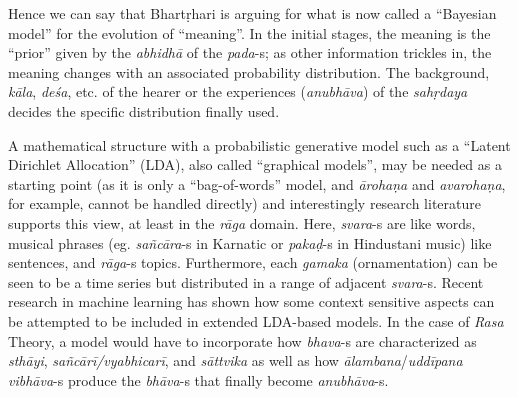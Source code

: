 Hence we can say that Bhartṛhari is arguing for what is now called a “Bayesian model” for the evolution of “meaning”. In the initial stages, the meaning is the “prior” given by the \textsl{abhidhā} of the \textsl{pada}-s; as other information trickles in, the meaning changes with an associated probability distribution. The background, \textsl{kāla}, \textsl{deśa}, etc. of the hearer or the experiences (\textsl{anubhāva}) of the \textsl{sahṛdaya} decides the specific distribution finally used. 

A mathematical structure with a probabilistic generative model such as a “Latent Dirichlet Allocation” (LDA), also called “graphical models”, may be needed as a starting point (as it is only a “bag-of-words” model, and \textsl{ārohaṇa} and \textsl{avarohaṇa}, for example, cannot be handled directly) and interestingly research literature supports this view, at least in the \textsl{rāga} domain. Here, \textsl{svara}-s are like words, musical phrases (eg. \textsl{sañcāra}-s in Karnatic or \textsl{pakaḍ}-s in Hindustani music) like sentences, and \textsl{rāga}-s topics. Furthermore, each \textsl{gamaka} (ornamentation) can be seen to be a time series but distributed in a range of adjacent \textsl{svara}-s. Recent research in machine learning has shown how some context sensitive aspects can be attempted to be included in extended LDA-based models. In the case of \textsl{Rasa} Theory, a model would have to incorporate how \textsl{bhava}-s are characterized as \textsl{sthāyi}, \textsl{sañcārī/vyabhicarī}, and \textsl{sāttvika} as well as how \textsl{ālambana}/\textsl{uddīpana vibhāva}-s produce the \textsl{bhāva}-s that finally become \textsl{anubhāva}-s.
